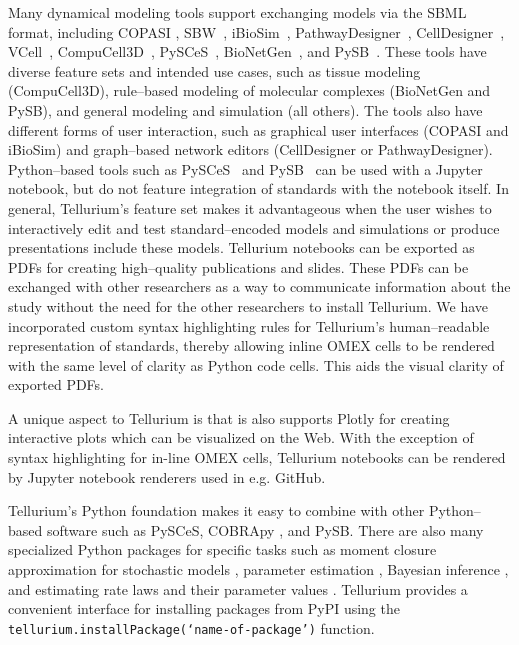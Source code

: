 \documentclass[10pt,letterpaper]{article}
\begin{document}
Many dynamical modeling tools support exchanging models via the SBML format, including COPASI \cite{hoops2006copasi,mendes2009computational}, SBW~\cite{bergmann2006sbw}, iBioSim~\cite{myers2009ibiosim}, PathwayDesigner~\cite{pathwaydesigner}, CellDesigner~\cite{Funahashi2008,Funahashi2003159}, VCell~\cite{moraru2008virtual,schaff2016rule}, CompuCell3D~\cite{swat2012multi}, PySCeS~\cite{olivier2005modelling}, BioNetGen~\cite{blinov2004bionetgen}, and PySB~\cite{lopez2013programming}. These tools have diverse feature sets and intended use cases, such as tissue modeling (CompuCell3D), rule--based modeling of molecular complexes (BioNetGen and PySB), and general modeling and simulation (all others). The tools also have different forms of user interaction, such as graphical user interfaces (COPASI and iBioSim) and graph--based network editors (CellDesigner or PathwayDesigner). Python--based tools such as PySCeS~\cite{olivier2005modelling} and PySB~\cite{lopez2013programming} can be used with a Jupyter notebook, but do not feature integration of standards with the notebook itself. In general, Tellurium's feature set makes it advantageous when the user wishes to interactively edit and test standard--encoded models and simulations or produce presentations include these models. Tellurium notebooks can be exported as PDFs for creating high--quality publications and slides. These PDFs can be exchanged with other researchers as a way to communicate information about the study without the need for the other researchers to install Tellurium. We have incorporated custom syntax highlighting rules for Tellurium's human--readable representation of standards, thereby allowing inline OMEX cells to be rendered with the same level of clarity as Python code cells. This aids the visual clarity of exported PDFs. %

A unique aspect to Tellurium is that is also supports Plotly for creating interactive plots which can be visualized on the Web. With the exception of syntax highlighting for in-line OMEX cells, Tellurium notebooks can be rendered by Jupyter notebook renderers used in e.g. GitHub.

Tellurium's Python foundation makes it easy to combine with other Python--based software such as PySCeS, COBRApy \cite{ebrahim2013cobrapy}, and PySB. There are also many specialized Python packages for specific tasks such as moment closure approximation for stochastic models \cite{fan2016means}, parameter estimation \cite{Swaminathan121152}, Bayesian inference \cite{liepe2010abc}, and estimating rate laws and their parameter values \cite{Theisen065177}. Tellurium provides a convenient interface for installing packages from PyPI using the \texttt{tellurium.installPackage(`name-of-package')} function.
\end{document}
